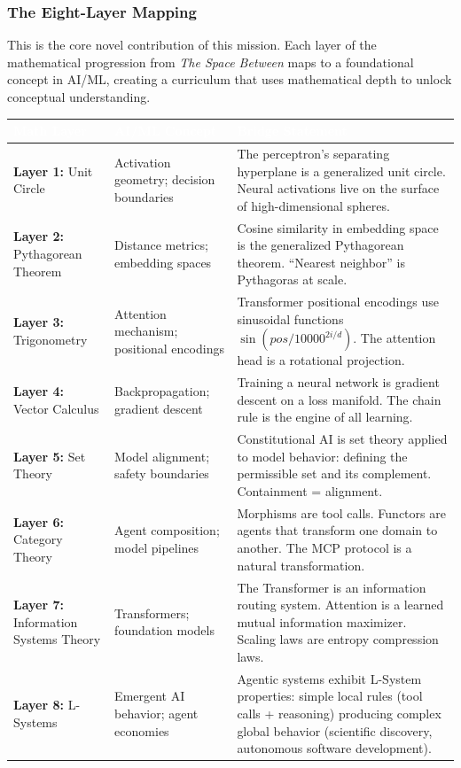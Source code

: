 \documentclass[11pt,letterpaper]{article}
\newcommand{\tableheader}[1]{\textbf{\sffamily\textcolor{white}{#1}}}
\begin{document}
\subsubsection{The Eight-Layer Mapping}

This is the core novel contribution of this mission. Each layer of the mathematical progression from \textit{The Space Between} maps to a foundational concept in AI/ML, creating a curriculum that uses mathematical depth to unlock conceptual understanding.

\begin{center}
\begin{longtable}{L{3.5cm}L{4cm}L{5.5cm}}
\toprule
{}
\tableheader{Math Layer} & \tableheader{AI/ML Concept} & \tableheader{Bridge Statement} \\
\midrule
\textbf{Layer 1:} Unit Circle & Activation geometry; decision boundaries & The perceptron's separating hyperplane is a generalized unit circle. Neural activations live on the surface of high-dimensional spheres. \\
\textbf{Layer 2:} Pythagorean Theorem & Distance metrics; embedding spaces & Cosine similarity in embedding space is the generalized Pythagorean theorem. ``Nearest neighbor'' is Pythagoras at scale. \\
\textbf{Layer 3:} Trigonometry & Attention mechanism; positional encodings & Transformer positional encodings use sinusoidal functions $\sin(pos/10000^{2i/d})$. The attention head is a rotational projection. \\
\textbf{Layer 4:} Vector Calculus & Backpropagation; gradient descent & Training a neural network is gradient descent on a loss manifold. The chain rule is the engine of all learning. \\
\textbf{Layer 5:} Set Theory & Model alignment; safety boundaries & Constitutional AI is set theory applied to model behavior: defining the permissible set and its complement. Containment = alignment. \\
\textbf{Layer 6:} Category Theory & Agent composition; model pipelines & Morphisms are tool calls. Functors are agents that transform one domain to another. The MCP protocol is a natural transformation. \\
\textbf{Layer 7:} Information Systems Theory & Transformers; foundation models & The Transformer is an information routing system. Attention is a learned mutual information maximizer. Scaling laws are entropy compression laws. \\
\textbf{Layer 8:} L-Systems & Emergent AI behavior; agent economies & Agentic systems exhibit L-System properties: simple local rules (tool calls + reasoning) producing complex global behavior (scientific discovery, autonomous software development). \\
\bottomrule
\end{longtable}
\end{center}
\end{document}
